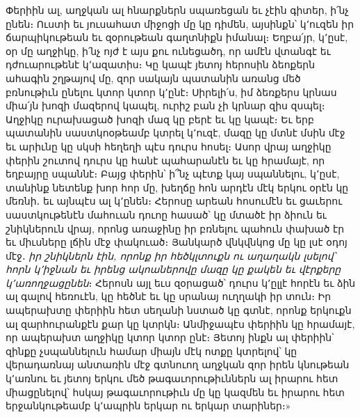 \documentclass{article}
\begin{document}
{Փերիին ալ, աղջկան ալ հնարքներն սպառեցան եւ չէին գիտեր, ի՛նչ ընեն։ Ուստի եւ յուսահատ միջոցի մը կը դիմեն, այսինքն՝ կ՚ուզեն իր ճարպիկութեան եւ զօրութեան գաղտնիքն իմանալ։ Եղբա՛յր, կ՚ըսէ, օր մը աղջիկը, ի՛նչ ոյժ է այս քու ունեցածդ, որ ամէն վտանգէ եւ դժուարութենէ կ՚ազատիս։ Կը կապէ յետոյ հերոսին ձեոքերն ահագին շղթայով մը, զոր սակայն պատանին առանց մեծ բռնութիւն ընելու կտոր կտոր կ՚ընէ։ Սիրելի՛ս, իմ ձեռքերս կրնաս միա՛յն խոզի մազերով կապել, ուրիշ բան չի կրնար զիս զսպել։ Աղջիկը ուրախացած խոզի մազ կը բերէ եւ կը կապէ։ Եւ երբ պատանին սաստկոօթեամբ կտրել կ՚ուզէ, մազը կը մտնէ մսին մէջ եւ արիւնը կը սկսի հեղեղի պէս դուրս հոսել։ Ասոր վրայ աղջիկը փերին շուտով դուրս կը հանէ պահարանէն եւ կը հրամայէ, որ եղբայրը սպաննէ։ Բայց փերին՝ ի՞նչ պէտք կայ սպաննելու, կ՚ըսէ, տանինք նետենք խոր հոր մը, խեղճը հոն արդէն մէկ երկու օրէն կը մեռնի․ եւ այնպէս ալ կ՚ընեն։ Հերոսը արեան հոսումէն եւ ցաւերու սաստկութենէն մահուան դուոը հասած՝ կը մտածէ իր ձիուն եւ շնիկներուն վրայ, որոնց առաջինը իր բռնելու պահուն փախած էր եւ միւսները լճին մէջ փակուած։ Յանկարծ վնկվնկոց մը կը լսէ օդոյ մէջ․ \emph{իր շնիկներն էին, որոնք իր հեծկլտուքն ու աղաղակն լսելով՝ հորն կ՚իջնան եւ իրենց ակոաներովը մազը կը քակեն եւ վէրքերը կ՚առողջացընեն}։ Հերոսն այլ եւս զօրացած՝ դուրս կ՚ըլլէ հորէն եւ ձին ալ գալով հեռուէն, կը հեծնէ եւ կը սրանայ ուղղակի իր տուն։ Իր ապերախտը փերիին հետ սեղանի նստած կը գտնէ, որոնք երկուքն ալ զարհուրանքէն քար կը կտրկն։ Անմիջապէս փերիին կը հրամայէ, որ ապերախտ աղջիկը կտոր կտոր ընէ։ Յետոյ ինքն ալ փերիին՝ զինքը չսպաննելուն համար միայն մէկ ոտքը կտրելով՝ կը վերադառնայ անտառին մէջ գտնուող աղջկան զոր իրեն կնութեան կ՚առնու եւ յետոյ երկու մեծ թագաւորութիւններն ալ իրարու հետ միացընելով՝ հսկայ թագաւորութիւն մը կը կազմեն եւ իրարու հետ երջանկութեամբ կ՚ապրին երկար ու երկար տարիներ։»

}
\end{document}
